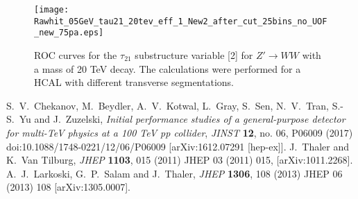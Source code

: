 \documentclass[a4paper]{PoS}
\begin{document}
 \begin{figure}
 \begin{center}
   \begin{minipage}[c]{0.4\textwidth}
     \texttt{[image: Rawhit\_05GeV\_tau21\_20tev\_eff\_1\_New2\_after\_cut\_25bins\_no\_UOF\_new\_75pa.eps]}
   \end{minipage}\hfill
   \begin{minipage}[c]{0.4\textwidth}
     \caption{
        ROC curves for the $\tau_{21}$ substructure variable [2] for  $Z'\rightarrow WW$ with 
a mass of 20 TeV decay. The calculations were performed for a HCAL with 
different transverse segmentations.
     } \label{1}
   \end{minipage}
    \end{center}
\end{figure}


\begin{thebibliography}{99}
  S.~V.~Chekanov, M.~Beydler, A.~V.~Kotwal, L.~Gray, S.~Sen, N.~V.~Tran, S.-S.~Yu and J.~Zuzelski,
  \emph{Initial performance studies of a general-purpose detector for multi-TeV physics at a 100 TeV pp collider},
  \emph{JINST} {\bf 12}, no. 06, P06009 (2017)
  doi:10.1088/1748-0221/12/06/P06009
  [arXiv:1612.07291 [hep-ex]].
  J.~Thaler and K.~Van Tilburg,
  \emph{JHEP} {\bf 1103}, 015 (2011)
  JHEP 03 (2011) 015, 
  [arXiv:1011.2268].
  A.~J.~Larkoski, G.~P.~Salam and J.~Thaler,
  \emph{JHEP} {\bf 1306}, 108 (2013)
  JHEP 06 (2013) 108
  [arXiv:1305.0007].

\end{thebibliography}
\end{document}
